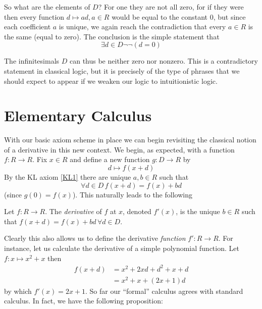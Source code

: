 So what are the elements of \( D \)? For one they are not all zero, for if they were then every function \( d\mapsto ad, a\in R \) would be equal to the constant \( 0 \), but since each coefficient \( a \) is unique, we again reach the contradiction that every \( a\in R \) is the same (equal to zero). The conclusion is the simple statement that
\begin{equation*}
  \exists d\in D \neg\neg(d=0)
\end{equation*}

The infinitesimals \( D \) can thus be neither zero nor nonzero. This is a contradictory statement in classical logic, but it is precisely of the type of phrases that we should expect to appear if we weaken our logic to intuitionistic logic.

\section{Elementary Calculus} \label{sec:elemcalc}

With our basic axiom scheme in place we can begin revisiting the classical notion of a derivative in this new context. We begin, as expected, with a function \( f:R\to R \). Fix \( x\in R \) and define a new function \( g:D\to R \) by
\begin{equation*}
  d\mapsto f(x+d)
\end{equation*}
By the KL axiom \ref{KL1} there are unique \( a,b\in R \) such that
\begin{equation*}
  \forall d\in D\, f(x+d) = f(x)+bd
\end{equation*}
(since \( g(0) = f(x) \)). This naturally leads to the following
\begin{defn}
  Let \( f:R\to R \). The \emph{derivative} of \( f \) at \( x \), denoted \( f'(x) \), is the unique \( b\in R \) such that \( f(x+d)=f(x)+bd\,\forall d\in D \).
  \label{def:1varder}
\end{defn}

Clearly this also allows us to define the derivative \emph{function} \( f':R\to R \). For instance, let us calculate the derivative of a simple polynomial function. Let \( f:x\mapsto x^2+x \) then
\begin{align*}
  f(x+d) & =  x^2+2xd + d^2 + x + d \\ 
         & =  x^2 + x + (2x+1)d
\end{align*}
by which \( f'(x)=2x+1 \). So far our ``formal'' calculus agrees with standard calculus. In fact, we have the following proposition:


